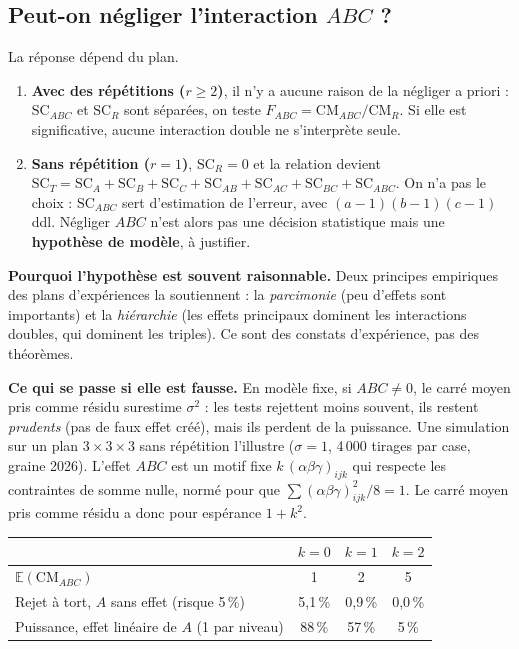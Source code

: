 \documentclass[11pt,a4paper]{article}
\theoremstyle{sj}
\theoremstyle{definition}
\theoremstyle{remark}
\newcommand{\E}{\mathbb{E}}
\newcommand{\SC}{\mathrm{SC}}
\newcommand{\CM}{\mathrm{CM}}
\begin{document}
\subsection{Peut-on négliger l'interaction $ABC$ ?}\label{sec:abc}

La réponse dépend du plan.

\begin{enumerate}[leftmargin=1.4em]
\item \textbf{Avec des répétitions ($r\ge2$)}, il n'y a aucune raison de la négliger a priori : $\SC_{ABC}$ et $\SC_R$ sont séparées, on teste $F_{ABC}=\CM_{ABC}/\CM_R$. Si elle est significative, aucune interaction double ne s'interprète seule.
\item \textbf{Sans répétition ($r=1$)}, $\SC_R=0$ et la relation devient $\SC_T=\SC_A+\SC_B+\SC_C+\SC_{AB}+\SC_{AC}+\SC_{BC}+\SC_{ABC}$. On n'a pas le choix : $\SC_{ABC}$ sert d'estimation de l'erreur, avec $(a-1)(b-1)(c-1)$ ddl. Négliger $ABC$ n'est alors pas une décision statistique mais une \textbf{hypothèse de modèle}, à justifier.
\end{enumerate}

\textbf{Pourquoi l'hypothèse est souvent raisonnable.} Deux principes empiriques des plans d'expériences la soutiennent : la \emph{parcimonie} (peu d'effets sont importants) et la \emph{hiérarchie} (les effets principaux dominent les interactions doubles, qui dominent les triples). Ce sont des constats d'expérience, pas des théorèmes.

\textbf{Ce qui se passe si elle est fausse.} En modèle fixe, si $ABC\ne0$, le carré moyen pris comme résidu surestime $\sigma^2$ : les tests rejettent moins souvent, ils restent \emph{prudents} (pas de faux effet créé), mais ils perdent de la puissance. Une simulation sur un plan $3\times3\times3$ sans répétition l'illustre ($\sigma=1$, 4\,000 tirages par case, graine 2026). L'effet $ABC$ est un motif fixe $k\,(\alpha\beta\gamma)_{ijk}$ qui respecte les contraintes de somme nulle, normé pour que $\sum(\alpha\beta\gamma)^2_{ijk}/8=1$. Le carré moyen pris comme résidu a donc pour espérance $1+k^2$.

\begin{center}
\begin{tabular}{l c c c}
\toprule
& $k=0$ & $k=1$ & $k=2$\\
\midrule
$\E(\CM_{ABC})$ & 1 & 2 & 5\\
Rejet à tort, $A$ sans effet (risque 5\,\%) & 5,1\,\% & 0,9\,\% & 0,0\,\%\\
Puissance, effet linéaire de $A$ (1 par niveau) & 88\,\% & 57\,\% & 5\,\%\\
\bottomrule
\end{tabular}
\end{center}
\end{document}
